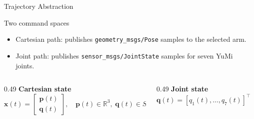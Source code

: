 \documentclass[10pt,aspectratio=169]{beamer}
\newcommand{\R}{\mathbb{R}}
\newcommand{\pose}{\mathbf{x}}
\newcommand{\quat}{\mathbf{q}}
\begin{document}
\begin{frame}{Trajectory Abstraction}
  \begin{block}{Two command spaces}
    \begin{itemize}
      \item Cartesian path: publishes \texttt{geometry\_msgs/Pose} samples to the selected arm.
      \item Joint path: publishes \texttt{sensor\_msgs/JointState} samples for seven YuMi joints.
    \end{itemize}
  \end{block}

  \vspace{0.15cm}
  \begin{columns}[T]
    \begin{column}{0.49\textwidth}
      \textbf{Cartesian state}
      \[
        \pose(t) =
        \begin{bmatrix}
          \mathbf{p}(t) \\
          \quat(t)
        \end{bmatrix},
        \quad
        \mathbf{p}(t) \in \R^3,\;\quat(t)\in SO(3).
      \]
    \end{column}
    \begin{column}{0.49\textwidth}
      \textbf{Joint state}
      \[
        \mathbf{q}(t) =
        [q_1(t),\ldots,q_7(t)]^\top \in \R^7.
      \]
    \end{column}
  \end{columns}
\end{frame}
\end{document}
